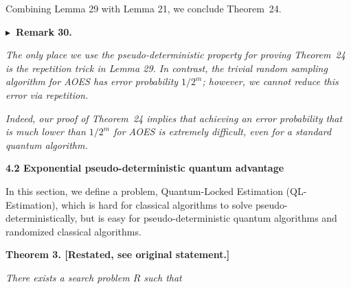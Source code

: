 \documentclass[10pt,a4paper]{article}
\begin{document}
Combining Lemma 29 with Lemma 21, we conclude Theorem 24.\par





\par\medskip\noindent\textbf{
$\blacktriangleright$ Remark 30.
}\par



\emph{The only place we use the pseudo-deterministic property for proving Theorem 24 is the repetition trick in Lemma 29. In contrast, the trivial random sampling algorithm for AOES has error probability $1/2^{m}$; however, we cannot reduce this error via repetition.}\par




\emph{Indeed, our proof of Theorem 24 implies that achieving an error probability that is much lower than $1/{2^{m}}$ for AOES is extremely difficult, even for a standard quantum algorithm.}\par









\par\medskip\noindent\textbf{
4.2 Exponential pseudo-deterministic quantum advantage}\par




In this section, we define a problem, Quantum-Locked Estimation (QL-Estimation), which is hard for classical algorithms to solve pseudo-deterministically, but is easy for pseudo-deterministic quantum algorithms and randomized classical algorithms.\par






\par\medskip\noindent\textbf{
\textbf{Theorem 3}\textbf{.}
[Restated, see original statement.]}\par



\emph{There exists a search problem ${R}$ such that}\par
\end{document}
